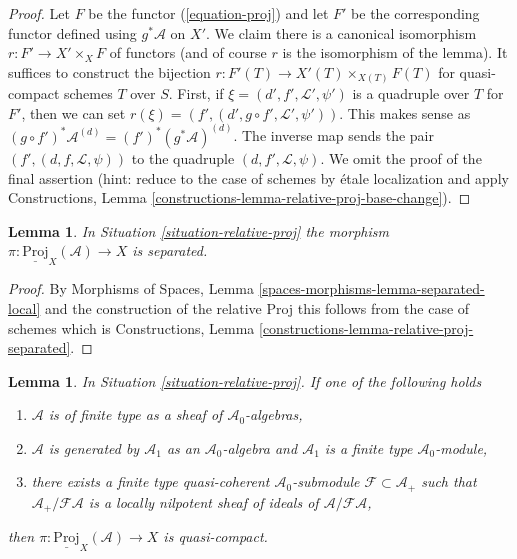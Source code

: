 \documentclass{stacks-project}
\theoremstyle{plain}
\newtheorem{lemma}[subsection]{Lemma}
\theoremstyle{definition}
\theoremstyle{remark}
\numberwithin{equation}{subsection}
\begin{document}
\begin{proof}
Let $F$ be the functor (\ref{equation-proj}) and let $F'$ be the
corresponding functor defined using $g^*\mathcal{A}$ on $X'$.
We claim there is a canonical isomorphism $r : F' \to X' \times_X F$
of functors (and of course $r$ is the isomorphism of the lemma).
It suffices to construct the bijection
$r : F'(T) \to X'(T) \times_{X(T)} F(T)$ for quasi-compact schemes $T$
over $S$. First, if $\xi = (d', f', \mathcal{L}', \psi')$ is a
quadruple over $T$ for $F'$, then we can set
$r(\xi) = (f', (d', g \circ f', \mathcal{L}', \psi'))$. This makes sense
as $(g \circ f')^*\mathcal{A}^{(d)} = (f')^*(g^*\mathcal{A})^{(d)}$.
The inverse map sends the pair $(f', (d, f, \mathcal{L}, \psi))$
to the quadruple $(d, f', \mathcal{L}, \psi)$. We omit the proof
of the final assertion (hint: reduce to the case of schemes by \'etale
localization and apply Constructions, Lemma
\ref{constructions-lemma-relative-proj-base-change}).
\end{proof}

\begin{lemma}
\label{lemma-relative-proj-separated}
In Situation \ref{situation-relative-proj} the morphism
$\pi : \underline{\text{Proj}}_X(\mathcal{A}) \to X$
is separated.
\end{lemma}

\begin{proof}
By Morphisms of Spaces, Lemma \ref{spaces-morphisms-lemma-separated-local}
and the construction of the relative Proj this follows from the
case of schemes which is
Constructions, Lemma \ref{constructions-lemma-relative-proj-separated}.
\end{proof}

\begin{lemma}
\label{lemma-relative-proj-quasi-compact}
In Situation \ref{situation-relative-proj}. If one of the following holds
\begin{enumerate}
\item $\mathcal{A}$ is of finite type as a sheaf of
$\mathcal{A}_0$-algebras,
\item $\mathcal{A}$ is generated by $\mathcal{A}_1$ as an
$\mathcal{A}_0$-algebra and $\mathcal{A}_1$ is a finite type
$\mathcal{A}_0$-module,
\item there exists a finite type quasi-coherent $\mathcal{A}_0$-submodule
$\mathcal{F} \subset \mathcal{A}_{+}$ such that
$\mathcal{A}_{+}/\mathcal{F}\mathcal{A}$ is a locally nilpotent
sheaf of ideals of $\mathcal{A}/\mathcal{F}\mathcal{A}$,
\end{enumerate}
then $\pi : \underline{\text{Proj}}_X(\mathcal{A}) \to X$ is quasi-compact.
\end{lemma}
\end{document}

